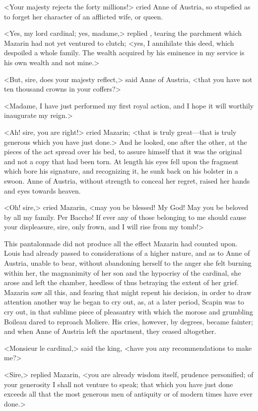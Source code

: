 <Your majesty rejects the forty millions!> cried Anne of Austria, so stupefied as to forget her character of an afflicted wife, or queen.

<Yes, my lord cardinal; yes, madame,> replied , tearing the parchment which Mazarin had not yet ventured to clutch; <yes, I annihilate this deed, which despoiled a whole family. The wealth acquired by his eminence in my service is his own wealth and not mine.>

<But, sire, does your majesty reflect,> said Anne of Austria, <that you have not ten thousand crowns in your coffers?>

<Madame, I have just performed my first royal action, and I hope it will worthily inaugurate my reign.>

<Ah! sire, you are right!> cried Mazarin; <that is truly great—that is truly generous which you have just done.> And he looked, one after the other, at the pieces of the act spread over his bed, to assure himself that it was the original and not a copy that had been torn. At length his eyes fell upon the fragment which bore his signature, and recognizing it, he sunk back on his bolster in a swoon. Anne of Austria, without strength to conceal her regret, raised her hands and eyes towards heaven.

<Oh! sire,> cried Mazarin, <may you be blessed! My God! May you be beloved by all my family. Per Baccho! If ever any of those belonging to me should cause your displeasure, sire, only frown, and I will rise from my tomb!>

This pantalonnade did not produce all the effect Mazarin had counted upon. Louis had already passed to considerations of a higher nature, and as to Anne of Austria, unable to bear, without abandoning herself to the anger she felt burning within her, the magnanimity of her son and the hypocrisy of the cardinal, she arose and left the chamber, heedless of thus betraying the extent of her grief. Mazarin saw all this, and fearing that  might repent his decision, in order to draw attention another way he began to cry out, as, at a later period, Scapin was to cry out, in that sublime piece of pleasantry with which the morose and grumbling Boileau dared to reproach Moliere. His cries, however, by degrees, became fainter; and when Anne of Austria left the apartment, they ceased altogether.

<Monsieur le cardinal,> said the king, <have you any recommendations to make me?>

<Sire,> replied Mazarin, <you are already wisdom itself, prudence personified; of your generosity I shall not venture to speak; that which you have just done exceeds all that the most generous men of antiquity or of modern times have ever done.>

